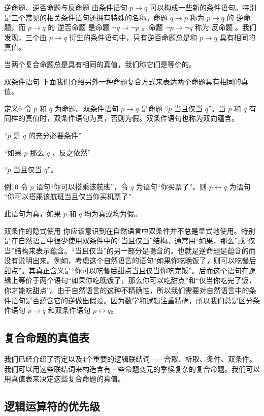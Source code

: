 逆命题、逆否命题与反命题 由条件语句
$p \to q$
可以构成一些新的条件语句。特别是三个常见的相关条件语句还拥有特殊的名称。命题
$q \to p$
称为
$p \to q$
的 逆命题，而
$p \to q$
的 逆否命题 是命题
$\neg q \to \neg p$
。命题
$\neg p \to \neg q$
称为 反命题 。我们发现，三个由
$p \to q$
衍生的条件语句中，只有逆否命题总是和
$p \to q$
具有相同的真值。  

当两个复合命题总是具有相同的真值，我们称它们是等价的。  

双条件语句  下面我们介绍另外一种命题复合方式来表达两个命题具有相同的真值。  

定义6  令
$p$
和
$q$
为命题。双条件语句
$p \to q$
是命题
“$p$
当且仅当
$q$”。当
$p$
和
$q$
有同样的真值时，双条件语句为真，否则为假。双条件语句也称为双向蕴含。

“$p$
是
$q$
的充分必要条件”

“如果
 $p$
 那么
 $q$
 ，反之依然”

“$p$
当且仅当
$q$”。


例10  令
$p$
语句“你可以搭乘该航班”，令
$q$
为语句“你买票了”。则
$p \leftrightarrow q$
为语句
“你可以搭乘该航班当且仅当你买机票了”

此语句为真，如果
$p$
和
$q$
均为真或均为假。  

双条件的隐式使用  你应该意识到在自然语言中双条件并不总是显式地使用。特别是在自然语言中很少使用双条件中的“当且仅当”结构。通常用“如果，那么”或“仅当”结构来表示蕴含。“当且仅当”的另一部分是隐含的。也就是逆命题是蕴含的而没有说明出来。例如，考虑这个自然语言的语句“如果你吃晚饭了，则可以吃餐后甜点”。其真正含义是“你可以吃餐后甜点当且仅当你吃完饭”。后而这个语句在逻辑上等价于两个语句“如果你吃晚饭了，那么你可以吃甜点”和“仅当你吃完了饭，你才能吃甜点”。由于自然语言的这种不精确性，所以我们需要对自然语言中的条件语句是否蕴含它的逆做出假设。因为数学和逻辑注重精确，所以我们总是区分条件语句
$p \to q$
和双条件语句
$p \leftrightarrow q$。

\subsection{复合命题的真值表}

我们已经介绍了否定以及4个重要的逻辑联结词——合取、析取、条件、双条件。我们可以用这些联结词来构造含有一些命题变元的季候复杂的复合命题。我们可以用真值表来决定这些复合命题的真值。

\subsection{逻辑运算符的优先级}

